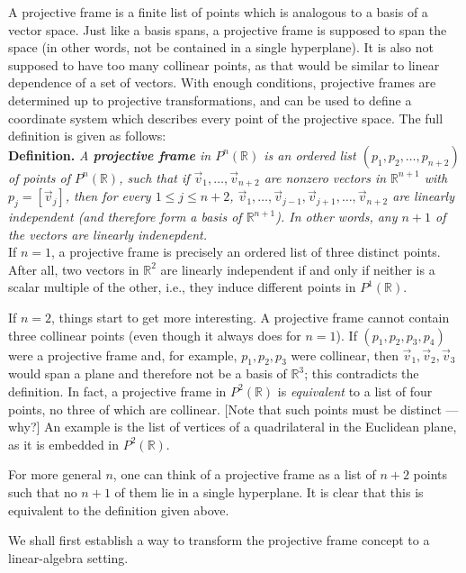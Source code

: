 \documentclass[leqno]{book}
\begin{document}
A projective frame is a finite list of points which is analogous to a basis of a vector space.  Just like a basis spans, a projective frame is supposed to span the space (in other words, not be contained in a single hyperplane).  It is also not supposed to have too many collinear points, as that would be similar to linear dependence of a set of vectors.  With enough conditions, projective frames are determined up to projective transformations, and can be used to define a coordinate system which describes every point of the projective space.  The full definition is given as follows:\\

\noindent\textbf{Definition.} \emph{A \textbf{projective frame} in $P^n(\mathbb R)$ is an ordered list $(p_1,p_2,\dots,p_{n+2})$ of points of $P^n(\mathbb R)$, such that if $\vec v_1,\dots,\vec v_{n+2}$ are nonzero vectors in $\mathbb R^{n+1}$ with $p_j=[\vec v_j]$, then for every $1\leqslant j\leqslant n+2$, $\vec v_1,\dots,\vec v_{j-1},\vec v_{j+1},\dots,\vec v_{n+2}$ are linearly independent (and therefore form a basis of $\mathbb R^{n+1}$).  In other words, any $n+1$ of the vectors are linearly indenepdent.}\\

\noindent If $n=1$, a projective frame is precisely an ordered list of three distinct points.  After all, two vectors in $\mathbb R^2$ are linearly independent if and only if neither is a scalar multiple of the other, i.e., they induce different points in $P^1(\mathbb R)$.

If $n=2$, things start to get more interesting.  A projective frame cannot contain three collinear points (even though it always does for $n=1$).  If $(p_1,p_2,p_3,p_4)$ were a projective frame and, for example, $p_1,p_2,p_3$ were collinear, then $\vec v_1,\vec v_2,\vec v_3$ would span a plane and therefore not be a basis of $\mathbb R^3$; this contradicts the definition.  In fact, a projective frame in $P^2(\mathbb R)$ is \emph{equivalent} to a list of four points, no three of which are collinear.  [Note that such points must be distinct \---- why?]  An example is the list of vertices of a quadrilateral in the Euclidean plane, as it is embedded in $P^2(\mathbb R)$.

For more general $n$, one can think of a projective frame as a list of $n+2$ points such that no $n+1$ of them lie in a single hyperplane.  It is clear that this is equivalent to the definition given above.

We shall first establish a way to transform the projective frame concept to a linear-algebra setting.\\
\end{document}
